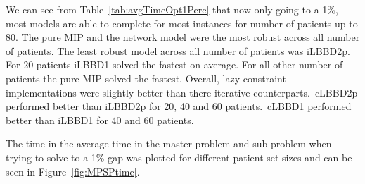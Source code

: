 We can see from Table~\ref{tab:avgTimeOpt1Perc} that now only going to a 1\%, most models are able to complete for most instances for number of patients up to 80. The pure MIP and the network model were the most robust across all number of patients. The least robust model across all number of patients was iLBBD2p. For 20 patients iLBBD1 solved the fastest on average. For all other number of patients the pure MIP solved the fastest. Overall, lazy constraint implementations were slightly better than there iterative counterparts.\ cLBBD2p performed better than iLBBD2p for 20, 40 and 60 patients.\ cLBBD1 performed better than iLBBD1 for 40 and 60 patients. 

The time in the average time in the master problem and sub problem when trying to solve to a 1\% gap was plotted for different patient set sizes and can be seen in Figure~\ref{fig:MPSPtime}.

